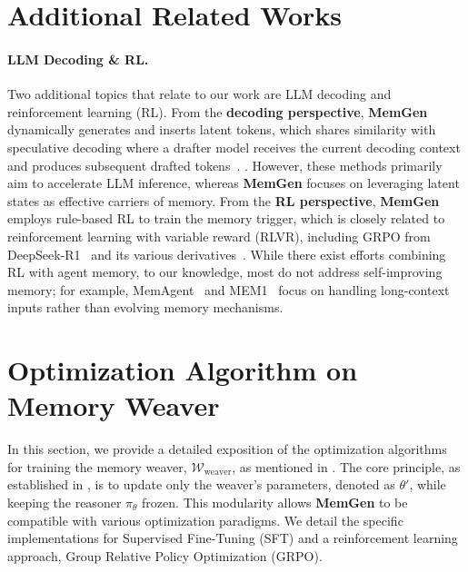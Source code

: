 \documentclass[]{fairmeta}
\newcommand{\ourmethod}{{\fontfamily{lmtt}\selectfont \textbf{MemGen}}\xspace}
\begin{document}



\clearpage
\newpage
\beginappendix


\appendix
{}



\section{Additional Related Works}

\paragraph{LLM Decoding \& RL.} Two additional topics that relate to our work are LLM decoding and reinforcement learning (RL). From the \textbf{decoding perspective}, \ourmethod dynamically generates and inserts latent tokens, which shares similarity with speculative decoding where a drafter model receives the current decoding context and produces subsequent drafted tokens~\citep{cai2024medusasimplellminference,fu2024breaksequentialdependencyllm,li2025eaglespeculativesamplingrequires,goel2025vocabtrimvocabularypruningefficient}.
. However, these methods primarily aim to accelerate LLM inference, whereas \ourmethod focuses on leveraging latent states as effective carriers of memory.
From the \textbf{RL perspective}, \ourmethod employs rule-based RL to train the memory trigger, which is closely related to reinforcement learning with variable reward (RLVR), including GRPO from DeepSeek-R1~\citep{deepseekai2025deepseekr1incentivizingreasoningcapability} and its various derivatives~\citep{qian2025toolrlrewardtoollearning,wu2025vtoolr1vlmslearnthink,wei2025autotirautonomoustoolsintegrated,fu2025agentrefineenhancingagentgeneralization}. 
While there exist efforts combining RL with agent memory, to our knowledge, most do not address self-improving memory; for example, MemAgent~\citep{yu2025memagentreshapinglongcontextllm} and MEM1~\citep{zhou2025mem1learningsynergizememory} focus on handling long-context inputs rather than evolving memory mechanisms.     

\section{Optimization Algorithm on Memory Weaver}\label{app:sft-grpo}


In this section, we provide a detailed exposition of the optimization algorithms for training the memory weaver, $\mathcal{W}_\text{weaver}$, as mentioned in . The core principle, as established in , is to update only the weaver's parameters, denoted as $\theta'$, while keeping the reasoner $\pi_\theta$ frozen. This modularity allows \ourmethod to be compatible with various optimization paradigms. We detail the specific implementations for Supervised Fine-Tuning (SFT) and a reinforcement learning approach, Group Relative Policy Optimization (GRPO).
\end{document}

